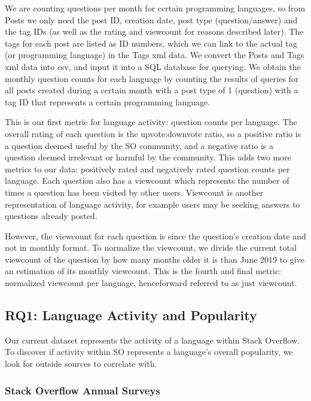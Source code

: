 \documentclass[conference]{IEEEtran}
\begin{document}
We are counting questions per month for certain programming languages, so from Posts we only need the post ID, creation date, post type (question/answer) and the tag IDs (as well as the rating and viewcount for reasons described later). The tags for each post are listed as ID numbers, which we can link to the actual tag (or programming language) in the Tags xml data. We convert the Posts and Tags xml data into csv, and input it into a SQL database for querying. We obtain the monthly question counts for each language by counting the results of queries for all posts created during a certain month with a post type of 1 (question) with a tag ID that represents a certain programming language.

This is our first metric for language activity: question counts per language. The overall rating of each question is the upvote:downvote ratio, so a positive ratio is a question deemed useful by the SO community, and a negative ratio is a question deemed irrelevant or harmful by the community. This adds two more metrics to our data: positively rated and negatively rated question counts per language. Each question also has a viewcount which represents the number of times a question has been visited by other users. Viewcount is another representation of language activity, for example users may be seeking answers to questions already posted.

However, the viewcount for each question is since the question's  creation date and not in monthly format. To normalize the viewcount, we divide the current total viewcount of the question by how many months older it is than June 2019 to give an estimation of its monthly viewcount. This is the fourth and final metric: normalized viewcount per language, henceforward referred to as just viewcount.

\subsection{RQ1: Language Activity and Popularity}

Our current dataset represents the activity of a language within Stack Overflow. To discover if activity within SO represents a language's overall popularity, we look for outside sources to correlate with.

\subsubsection{Stack Overflow Annual Surveys}
\end{document}
